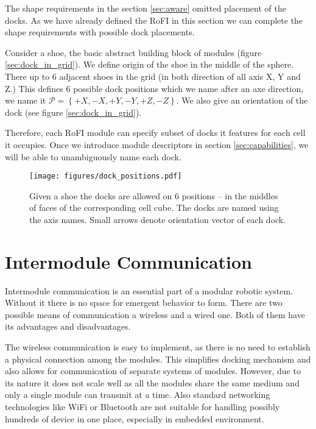The shape requirements in the section \ref{sec:aware} omitted placement of the
docks. As we have already defined the RoFI in this section we can complete the
shape requirements with possible dock placements.

Consider a shoe, the basic abstract building block of modules (figure
\ref{sec:dock_in_grid}). We define origin of the shoe in the middle of the
sphere. There up to 6 adjacent shoes in the grid (in both direction of all axis
X, Y and Z.) This defines 6 possible dock positions which we name after an axe
direction, we name it $\mathcal{P} = \left\{+X, -X, +Y, -Y, +Z, -Z\right\}$. We
also give an orientation of the dock (see figure \ref{sec:dock_in_grid}).

Therefore, each RoFI module can specify subset of docks it features for each
cell it occupies. Once we introduce module descriptors in section
\ref{sec:capabilities}, we will be able to unambiguously name each dock.

\begin{figure}[t]
    \centering
    \texttt{[image: figures/dock\_positions.pdf]}
    \caption{Given a shoe the docks are allowed on 6 positions -- in the
    middles of faces of the corresponding cell cube. The docks are named using
    the axis names. Small arrows denote orientation vector of each dock.}
    \label{fig:dock_positions}
\end{figure}

\section{Intermodule Communication}\label{sec:communication}

Intermodule communication is an essential part of a modular robotic system.
Without it there is no space for emergent behavior to form. There are two
possible means of communication a wireless and a wired one. Both of them have
its advantages and disadvantages.

The wireless communication is easy to implement, as there is no need to
establish a physical connection among the modules. This simplifies docking
mechanism and also allows for communication of separate systems of modules.
However, due to its nature it does not scale well as all the modules share the
same medium and only a single module can transmit at a time. Also standard
networking technologies like WiFi or Bluetooth are not suitable for handling
possibly hundreds of device in one place, especially in embedded environment.

